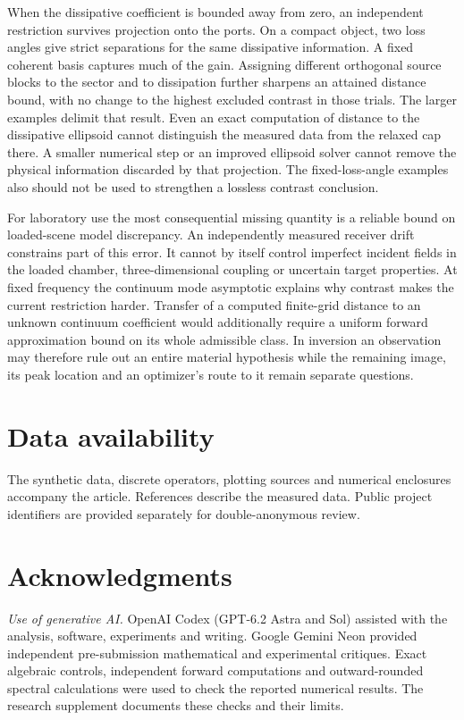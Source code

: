 \documentclass[anonymous,12pt]{iopjournal}
\numberwithin{equation}{section}
\begin{document}
When the dissipative coefficient is bounded away from zero, an independent restriction survives projection onto the ports. On a compact object, two loss angles give strict separations for the same dissipative information. A fixed coherent basis captures much of the gain. Assigning different orthogonal source blocks to the sector and to dissipation further sharpens an attained distance bound, with no change to the highest excluded contrast in those trials. The larger examples delimit that result. Even an exact computation of distance to the dissipative ellipsoid cannot distinguish the measured data from the relaxed cap there. A smaller numerical step or an improved ellipsoid solver cannot remove the physical information discarded by that projection. The fixed-loss-angle examples also should not be used to strengthen a lossless contrast conclusion.

For laboratory use the most consequential missing quantity is a reliable bound on loaded-scene model discrepancy. An independently measured receiver drift constrains part of this error. It cannot by itself control imperfect incident fields in the loaded chamber, three-dimensional coupling or uncertain target properties. At fixed frequency the continuum mode asymptotic explains why contrast makes the current restriction harder. Transfer of a computed finite-grid distance to an unknown continuum coefficient would additionally require a uniform forward approximation bound on its whole admissible class. In inversion an observation may therefore rule out an entire material hypothesis while the remaining image, its peak location and an optimizer's route to it remain separate questions.

\appendix

\section*{Data availability}
The synthetic data, discrete operators, plotting sources and numerical enclosures accompany the article. References \cite{fresnel,manitoba} describe the measured data. Public project identifiers are provided separately for double-anonymous review.
\section*{Acknowledgments}
\textit{Use of generative AI.} OpenAI Codex (GPT-6.2 Astra and Sol) assisted with the analysis, software, experiments and writing. Google Gemini Neon provided independent pre-submission mathematical and experimental critiques. Exact algebraic controls, independent forward computations and outward-rounded spectral calculations were used to check the reported numerical results. The research supplement documents these checks and their limits.

\end{document}
